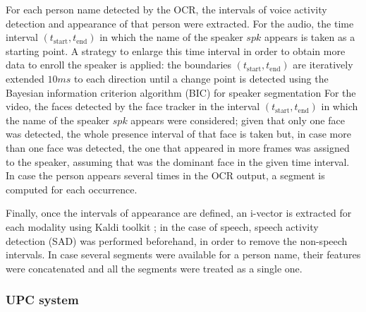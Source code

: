 For each person name detected by the OCR, the intervals of voice activity detection and appearance of that person were extracted. For the audio, 
the time interval $(t_{\mathrm{start}},t_{\mathrm{end}})$ in which the name of the speaker $spk$ appears is taken as a starting point. A strategy to enlarge this time
 interval in order to obtain more data to enroll the speaker is applied: the boundaries $(t_{\mathrm{start}},t_{\mathrm{end}})$ are iteratively extended $10ms$ to each direction until a change point is detected using the Bayesian information criterion algorithm
 (BIC) for speaker segmentation
%
% 
For the video, the faces detected by the face tracker in the interval $(t_{\mathrm{start}},t_{\mathrm{end}})$ in 
 which the name of the speaker $spk$ appears were considered; given that only one face was detected, the whole presence interval of that face is taken but, in case more than 
 one face was detected, the one that appeared in more frames was assigned to the speaker, assuming that was the dominant face in the given time interval.
 In case the person appears several times in the OCR output, a segment is computed for each occurrence.
 
 Finally, once the intervals of appearance are defined, an i-vector \cite{dehak10} is extracted for each modality using Kaldi toolkit \cite{kaldi}; in the case of speech, speech activity detection (SAD) was performed
 beforehand, in order to remove the non-speech intervals. In case several segments were available for a person name, their features were concatenated and all the segments
 were treated as a single one.

\subsubsection{UPC system}

